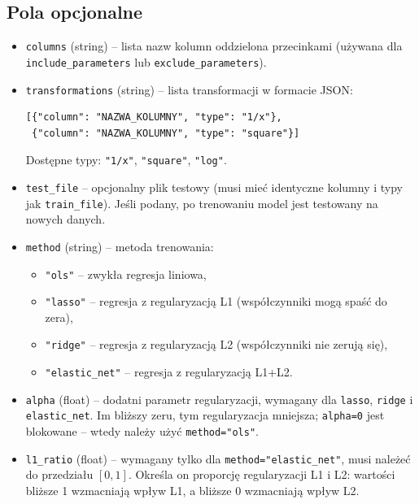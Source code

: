\documentclass[12pt,a4paper]{article}
\begin{document}
\subsection{Pola opcjonalne}
\begin{itemize}
    \item \texttt{columns} (string) – lista nazw kolumn oddzielona przecinkami (używana dla \texttt{include\_parameters} lub \texttt{exclude\_parameters}).
    \item \texttt{transformations} (string) – lista transformacji w formacie JSON:
        \begin{verbatim}
[{"column": "NAZWA_KOLUMNY", "type": "1/x"},
 {"column": "NAZWA_KOLUMNY", "type": "square"}]
        \end{verbatim}
        Dostępne typy: \texttt{"1/x"}, \texttt{"square"}, \texttt{"log"}.
    \item \texttt{test\_file} – opcjonalny plik testowy (musi mieć identyczne kolumny i typy jak \texttt{train\_file}). Jeśli podany, po trenowaniu model jest testowany na nowych danych.
    \item \texttt{method} (string) – metoda trenowania:
        \begin{itemize}
            \item \texttt{"ols"} – zwykła regresja liniowa,
            \item \texttt{"lasso"} – regresja z regularyzacją L1 (współczynniki mogą spaść do zera),
            \item \texttt{"ridge"} – regresja z regularyzacją L2 (współczynniki nie zerują się),
            \item \texttt{"elastic\_net"} – regresja z regularyzacją L1+L2.
        \end{itemize}
    \item \texttt{alpha} (float) – dodatni parametr regularyzacji, wymagany dla \texttt{lasso}, \texttt{ridge} i \texttt{elastic\_net}. Im bliższy zeru, tym regularyzacja mniejsza; \texttt{alpha=0} jest blokowane – wtedy należy użyć \texttt{method="ols"}.
    \item \texttt{l1\_ratio} (float) – wymagany tylko dla \texttt{method="elastic\_net"}, musi należeć do przedziału \([0, 1]\). Określa on proporcję regularyzacji L1 i L2: wartości bliższe 1 wzmacniają wpływ L1, a bliższe 0 wzmacniają wpływ L2.
\end{itemize}
\end{document}

